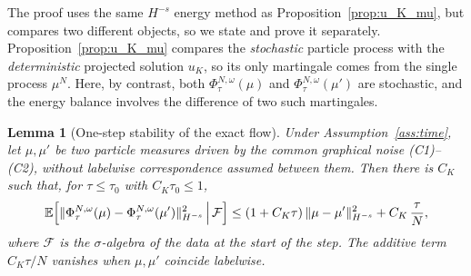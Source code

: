 \documentclass[a4paper,fleqn]{cas-sc}
\newtheorem{lemma}[theorem]{Lemma}
\theoremstyle{definition}
\theoremstyle{remark}
\begin{document}
The proof uses the same $H^{-s}$ energy method as
Proposition~\ref{prop:u_K_mu}, but compares two different objects, so we state and
prove it separately. Proposition~\ref{prop:u_K_mu} compares the \emph{stochastic}
particle process with the \emph{deterministic} projected solution $u_K$, so its
only martingale comes from the single process $\mu^N$. Here, by contrast, both
$\Phi^{N,\omega}_\tau(\mu)$ and $\Phi^{N,\omega}_\tau(\mu')$ are stochastic, and
the energy balance involves the difference of two such martingales.

\begin{lemma}[One-step stability of the exact flow]\label{lem:stability}
Under Assumption~\ref{ass:time}, let $\mu,\mu'$ be two particle measures driven by
the common graphical noise (C1)--(C2), without labelwise correspondence assumed
between them. Then there is $C_K$ such that, for $\tau\le\tau_0$ with $C_K\tau_0\le1$,
\begin{equation}\label{eq:stab}
\mathbb E\Bigl[\|\Phi^{N,\omega}_\tau(\mu)-\Phi^{N,\omega}_\tau(\mu')\|_{H^{-s}}^2
\,\Big|\,\mathcal F\Bigr]
\le(1+C_K\tau)\,\|\mu-\mu'\|_{H^{-s}}^2+C_K\,\frac{\tau}{N},
\end{equation}
where $\mathcal F$ is the $\sigma$-algebra of the data at the start of the step.
The additive term $C_K\tau/N$ vanishes when $\mu,\mu'$ coincide labelwise.
\end{lemma}
\end{document}
